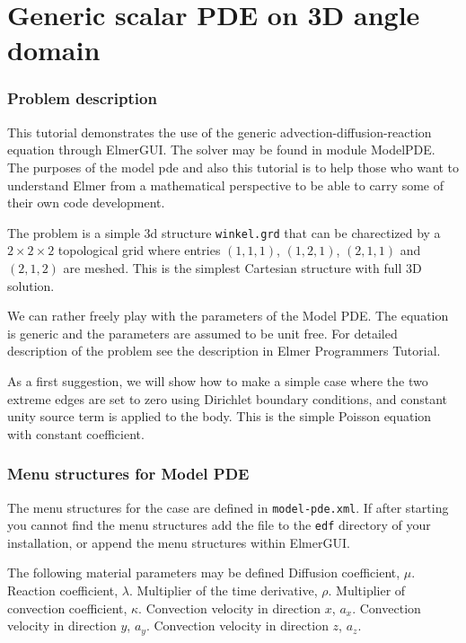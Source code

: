 \chapter{Generic scalar PDE on 3D angle domain}



\subsection*{Problem description}

This tutorial demonstrates the use of the generic advection-diffusion-reaction 
equation through ElmerGUI. The solver may be found in module ModelPDE. 
The purposes of the model pde and also this tutorial is to help 
those who want to understand Elmer from a mathematical perspective to be
able to carry some of their own code development. 

The problem is a simple 3d structure \texttt{winkel.grd} that can be charectized by a 
$2\times 2\times 2$ topological grid where entries $(1,1,1)$, $(1,2,1)$, $(2,1,1)$ and
$(2,1,2)$ are meshed. This is the simplest Cartesian structure with full 3D 
solution. 

We can rather freely play with the parameters of the Model PDE. The equation is 
generic and the parameters are assumed to be unit free. 
For detailed description of the problem see the description in Elmer Programmers Tutorial.

As a first suggestion, we will show how to make a simple case where the two extreme edges 
are set to zero using Dirichlet boundary conditions, and constant unity source term is 
applied to the body. This is the simple Poisson equation with constant coefficient. 

\subsection*{Menu structures for Model PDE}

The menu structures for the case are defined in \texttt{model-pde.xml}. If after starting
you cannot find the menu structures add the file to the \texttt{edf} directory of your installation,
or append the menu structures within ElmerGUI. 

\noindent 
The following material parameters may be defined
\sifbegin
{}
Diffusion coefficient, $\mu$.
Reaction coefficient, $\lambda$.
Multiplier of the time derivative, $\rho$.
Multiplier of convection coefficient, $\kappa$.
Convection velocity in direction $x$, $a_x$.
Convection velocity in direction $y$, $a_y$.
Convection velocity in direction $z$, $a_z$.
\sifend

